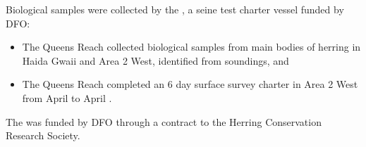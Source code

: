 Biological samples were collected by the ,
a seine test charter vessel funded by DFO:

\begin{itemize}

\item The Queens Reach collected biological samples from
main bodies of herring in Haida Gwaii and Area 2 West,
identified from soundings, and

\item The Queens Reach completed an 6 day surface survey charter
in Area 2 West from April  to April .

\end{itemize}

The  was funded by DFO through a contract to
the Herring Conservation Research Society.

